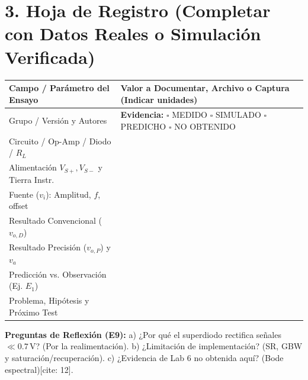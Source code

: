 \documentclass[10pt, a4paper]{article}
\begin{document}
\section*{3. Hoja de Registro (Completar con Datos Reales o Simulación Verificada)}
\begin{table}[htbp]
    \centering
    \scriptsize
    \renewcommand{\arraystretch}{1.45}
    \begin{tabularx}{\textwidth}{|P{4.2cm}|Y|}
    \hline
    \textbf{Campo / Parámetro del Ensayo} & \textbf{Valor a Documentar, Archivo o Captura (Indicar unidades)} \\ \hline
    Grupo / Versión y Autores & \textbf{Evidencia:} $\square$ MEDIDO \quad $\square$ SIMULADO \quad $\square$ PREDICHO \quad $\square$ NO OBTENIDO \\ \hline
    Circuito / Op-Amp / Diodo / $R_L$ & \\ \hline
    Alimentación $V_{S+}, V_{S-}$ y Tierra Instr. & \\ \hline
    Fuente ($v_i$): Amplitud, $f$, offset & \\ \hline
    Resultado Convencional ($v_{o,D}$) & \\ \hline
    Resultado Precisión ($v_{o,P}$) y $v_a$ & \\ \hline
    Predicción vs. Observación (Ej. $E_1$) & \\ \hline
    Problema, Hipótesis y Próximo Test & \\ \hline
    \end{tabularx}
\end{table}
\noindent\textbf{Preguntas de Reflexión (E9):} a) ¿Por qué el superdiodo rectifica señales $\ll 0.7\,\text{V}$? (Por la realimentación). b) ¿Limitación de implementación? (SR, GBW y saturación/recuperación). c) ¿Evidencia de Lab 6 no obtenida aquí? (Bode espectral)[cite: 12].
\end{document}
